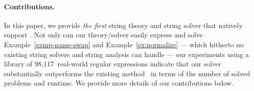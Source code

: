 {%
}



\paragraph*{Contributions.}
In this paper, we provide \emph{the first} string theory and string
solver that natively support \regexp{}. Not only can our theory/solver
easily express and solve Example~\ref{exmp-name-swap} and
Example~\ref{ex:normalize} --- which hitherto no existing string
solvers and string analysis can handle --- our experiments using a
library of 98,117~real-world regular expressions indicate that our
solver substantially outperforms the existing method~\cite{LMK19} in
terms of the number of solved problems and runtime.
We provide more details of our contributions below.

